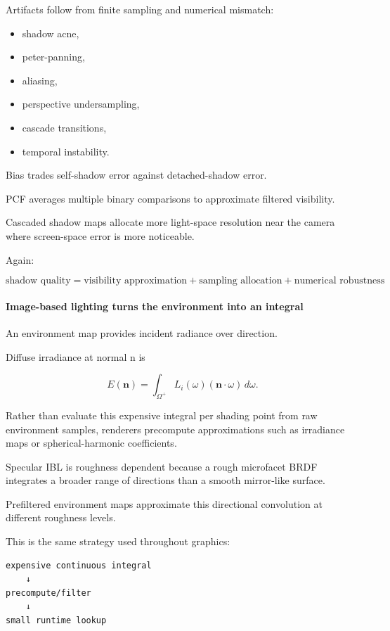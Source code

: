 Artifacts follow from finite sampling and numerical mismatch:

\begin{itemize}
\tightlist
\item
  shadow acne,
\item
  peter-panning,
\item
  aliasing,
\item
  perspective undersampling,
\item
  cascade transitions,
\item
  temporal instability.
\end{itemize}

Bias trades self-shadow error against detached-shadow error.

PCF averages multiple binary comparisons to approximate filtered visibility.

Cascaded shadow maps allocate more light-space resolution near the camera where screen-space error is more noticeable.

Again:

\[
\boxed{
\text{shadow quality}
=
\text{visibility approximation}
+
\text{sampling allocation}
+
\text{numerical robustness}
}
\]

\paragraph{Image-based lighting turns the environment into an integral}\label{image-based-lighting-turns-the-environment-into-an-integral}

An environment map provides incident radiance over direction.

Diffuse irradiance at normal n is

\[
E(\mathbf n)
=
\int_{\Omega^+}
L_i(\omega)
(\mathbf n\cdot\omega)
\,d\omega.
\]

Rather than evaluate this expensive integral per shading point from raw environment samples, renderers precompute approximations such as irradiance maps or spherical-harmonic coefficients.

Specular IBL is roughness dependent because a rough microfacet BRDF integrates a broader range of directions than a smooth mirror-like surface.

Prefiltered environment maps approximate this directional convolution at different roughness levels.

This is the same strategy used throughout graphics:

\begin{verbatim}
expensive continuous integral
    ↓
precompute/filter
    ↓
small runtime lookup
\end{verbatim}

